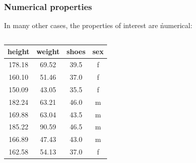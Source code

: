 \documentclass[t]{beamer} %
\begin{document}
\begin{frame}
  \frametitle{Numerical properties}

  In many other cases, the properties of interest are \h{numerical}:

  \ungap
  \begin{columns}[t]
    \begin{column}{5cm}
      \begin{center}
        
        \gap\small
        \begin{tabular}{cccc}
          \toprule
          height & weight & shoes & sex\\
          \midrule
          178.18 &  69.52 &  39.5 & f \\
          160.10 &  51.46 &  37.0 & f \\
          150.09 &  43.05 &  35.5 & f \\
          182.24 &  63.21 &  46.0 & m \\
          169.88 &  63.04 &  43.5 & m \\
          185.22 &  90.59 &  46.5 & m \\
          166.89 &  47.43 &  43.0 & m \\
          162.58 &  54.13 &  37.0 & f \\
          \bottomrule
        \end{tabular}
      \end{center}
    \end{column}
    \begin{column}{5cm}
      \pause
      \begin{center}


\end{center}
\end{column}
\end{columns}
\end{frame}
\end{document}
